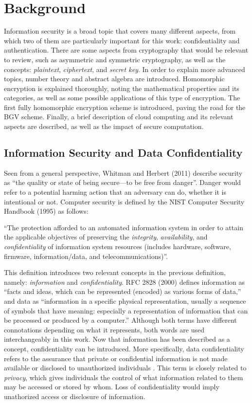 \chapter{Background}
\label{background}

Information security is a broad topic that covers many different aspects, from which two of them are particularly important for this work: confidentiality and authentication. There are some aspects from cryptography that would be relevant to review, such as asymmetric and symmetric cryptography, as well as the concepts: \emph{plaintext}, \emph{ciphertext}, and \emph{secret key}. In order to explain more advanced topics, number theory and abstract algebra are introduced. Homomorphic encryption is explained thoroughly, noting the mathematical properties and its categories, as well as some possible applications of this type of encryption. The first fully homomorphic encryption scheme is introduced, paving the road for the BGV scheme. Finally, a brief description of cloud computing and its relevant aspects are described, as well as the impact of secure computation.

\section{Information Security and Data Confidentiality}

Seen from a general perspective, Whitman and Herbert (2011) \cite{PrinciplesInformationSecurity} describe security as ``the quality or state of being secure---to be free from danger''. Danger would refer to a potential harming action that an adversary can do, whether it is intentional or not. Computer security is defined by the NIST Computer Security Handbook (1995) \cite{NIST95} as follows:

``The protection afforded to an automated information system in order to attain the applicable objectives of preserving the \emph{integrity}, \emph{availability}, and \emph{confidentiality} of information system resources (includes hardware, software, firmware, information/data, and telecommunications)''.

This definition introduces two relevant concepts in the previous definition, namely: \emph{information} and \emph{confidentiality}. RFC 2828 (2000) \cite{shirey2000rfc} defines information as ``facts and ideas, which can be represented (encoded) as various forms of data,'' and data as ``information in a specific physical representation, usually a sequence of symbols that have meaning: especially a representation of information that can be processed or produced by a computer.'' Although both terms have different connotations depending on what it represents, both words are used interchangeably in this work. Now that information has been described as a concept, confidentiality can be introduced. More specifically, data confidentiality refers to the assurance that private or confidential information is not made available or disclosed to unauthorized individuals \cite{CryptoStallings}. This term is closely related to \textit{privacy}, which gives individuals the control of what information related to them may be accessed or stored by whom. Loss of confidentiality would imply unathorized access or disclosure of information.

